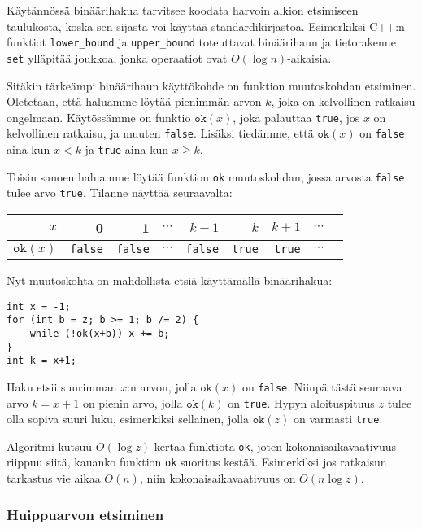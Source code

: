 Käytännössä binäärihakua tarvitsee koodata
harvoin alkion etsimiseen taulukosta,
koska sen sijasta voi käyttää standardikirjastoa.
Esimerkiksi C++:n funktiot \texttt{lower\_bound}
ja \texttt{upper\_bound} toteuttavat binäärihaun
ja tietorakenne \texttt{set} ylläpitää joukkoa,
jonka operaatiot ovat $O(\log n)$-aikaisia.

Sitäkin tärkeämpi binäärihaun käyttökohde on 
funktion muutoskohdan etsiminen.
Oletetaan, että haluamme löytää pienimmän arvon $k$,
joka on kelvollinen ratkaisu ongelmaan.
Käytössämme on funktio $\texttt{ok}(x)$,
joka palauttaa \texttt{true}, jos $x$ on kelvollinen
ratkaisu, ja muuten \texttt{false}.
Lisäksi tiedämme, että $\texttt{ok}(x)$ on \texttt{false}
aina kun $x<k$ ja \texttt{true} aina kun $x \geq k$.

Toisin sanoen haluamme löytää funktion \texttt{ok} muutoskohdan,
jossa arvosta \texttt{false} tulee arvo \texttt{true}.
Tilanne näyttää seuraavalta:

\begin{center}
\begin{tabular}{r|rrrrrrrr}
$x$ & 0 & 1 & $\cdots$ & $k-1$ & $k$ & $k+1$ & $\cdots$ \\
\hline
$\texttt{ok}(x)$ & \texttt{false} & \texttt{false}
& $\cdots$ & \texttt{false} & \texttt{true} & \texttt{true} & $\cdots$ \\
\end{tabular}
\end{center}

\noindent
Nyt muutoskohta on mahdollista etsiä käyttämällä
binäärihakua:

\begin{lstlisting}
int x = -1;
for (int b = z; b >= 1; b /= 2) {
    while (!ok(x+b)) x += b;
}
int k = x+1;
\end{lstlisting}

Haku etsii suurimman $x$:n arvon,
jolla $\texttt{ok}(x)$ on \texttt{false}.
Niinpä tästä seuraava arvo $k=x+1$
on pienin arvo, jolla $\texttt{ok}(k)$ on \texttt{true}.
Hypyn aloituspituus $z$ tulee olla 
sopiva suuri luku, esimerkiksi sellainen,
jolla $\texttt{ok}(z)$ on varmasti \texttt{true}.

Algoritmi kutsuu $O(\log z)$ kertaa funktiota
\texttt{ok}, joten kokonaisaikavaativuus
riippuu siitä, kauanko funktion \texttt{ok}
suoritus kestää.
Esimerkiksi jos ratkaisun tarkastus
vie aikaa $O(n)$, niin kokonaisaikavaativuus
on $O(n \log z)$.

\subsubsection{Huippuarvon etsiminen}

